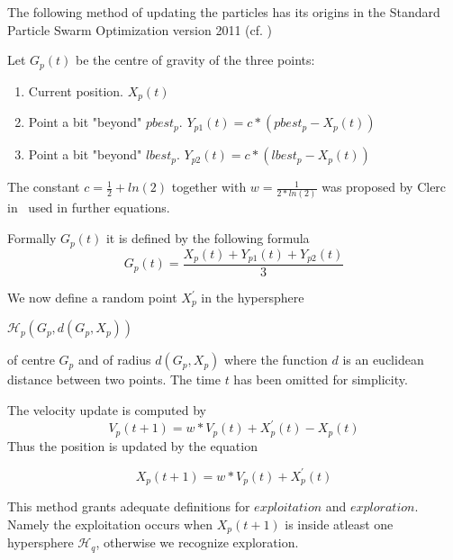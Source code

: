 \documentclass[runningheads,a4paper]{llncs}
\begin{document}
The following method of updating the particles has its origins in the Standard Particle Swarm Optimization version 2011 (cf. \cite{pso_11})

Let $G_p(t)$ be the centre of gravity of the three points:
\begin{enumerate}
	\item Current position. $X_p(t)$
	
	\item Point a bit "beyond" $pbest_p$. $Y_{p1}(t) = c*(pbest_p-X_p(t))$
	
	\item Point a bit "beyond" $lbest_p$. $Y_{p2}(t) = c*(lbest_p-X_p(t))$
			
\end{enumerate}

The constant $c = \frac{1}{2} + ln(2)$ together with $w = \frac{1}{2 * ln(2)}$ was proposed by Clerc in~\cite{pso_anal}  used in further equations. 

Formally $G_p(t)$ it is defined by the following formula 
\begin{equation}
	G_p(t) = \frac{X_p(t) + Y_{p1}(t) + Y_{p2}(t)} {3}
\end{equation}

We now define a random point $X^{'}_p$ in the hypersphere
\begin{center}
	$\mathcal{H}_p(G_p, d(G_p, X_p))$ 
\end{center}
of centre $G_p$ and of radius $d(G_p, X_p)$ where the function $d$ is an euclidean distance between two points. The time $t$ has been omitted for simplicity.

The velocity update is computed by
\begin{equation}
	V_p(t+1) = w*V_p(t) + X^{'}_p(t) - X_p(t)
\end{equation}
Thus the position is updated by the equation

\begin{equation}
	X_p(t+1) = w*V_p(t) + X^{'}_p(t)
\end{equation}

This method grants adequate definitions for $exploitation$ and $exploration$. Namely the exploitation occurs when $X_p(t+1)$ is inside atleast one hypersphere $\mathcal{H}_q$, otherwise we recognize exploration.

\end{document}
